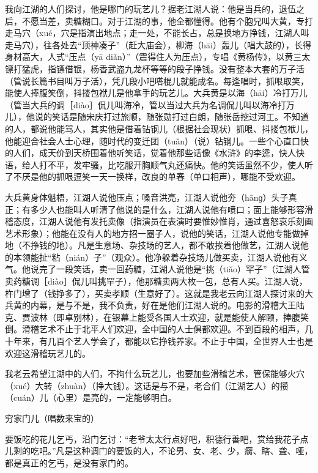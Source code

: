 \documentclass[12pt,UTF8]{ctexbook}
\begin{document}
我向江湖的人们探讨，他是哪门的玩艺儿？据老江湖人说：他是当兵的，退伍之后，不愿当差，卖糖糊口。对于江湖的事，他全都懂得。他有个胞兄叫大黄，专打走马穴（xué，穴是指演出地点；走一处，不能长占，总是换地方挣钱，江湖人叫走马穴），往各处去“顶神凑子”（赶大庙会），柳海（hāi）轰儿（唱大鼓的），长得身材高大，人式“压点（yā diǎn）”（震得住人为压点），专唱《黄杨传》，以黄三太镖打猛虎，指镖借银，杨香武盗九龙杯等等的段子挣钱。没有整本大套的万子活（管说长篇书目叫万子活），凭几段小吧嗒棍儿就能成名。每逢唱时，抓哏取笑，能使人捧腹笑倒，抖搂包袱儿是他拿手的玩艺儿。大兵黄是以海（hāi）冷打万儿（管当大兵的调［diào］侃儿叫海冷，管以当过大兵为名调侃儿叫以海冷打万儿），他说的笑话是随宋庆打过旅顺，随张勋打过白朗，随张岳挖过河工。不知道的人，都说他能骂人，其实他是借着钻钢儿（根据社会现状）抓哏、抖搂包袱儿，他能迎合社会人士心理，随时代的变迁团（tuǎn）（说）钻钢儿。一些个心直口快的人们，成天价到天桥围着他听笑话，觉着他那些话像《水浒》的李逵，快人快语，给人打不平，发牢骚，比吃服开胸顺气丸还痛快。他的笑话虽然不少，使人听了不厌是他的抓哏逗笑一天一换样，改良的单春（单口相声），哪能不受欢迎。

大兵黄身体魁梧，江湖人说他压点；嗓音洪亮，江湖人说他夯（hānɡ）头子真正；有多少人也能叫人听清了他说的是什么，江湖人说他有喷口；面上能够形容滑稽态度，江湖人说他有发托卖像（指演员在表演时要惟妙惟肖，通过喜怒哀乐刻画艺术形象）；他能在没有人的地方招一圈子人，说他的笑话，江湖人说他专能做掉地（不挣钱的地）。凡是生意场、杂技场的艺人，都不敢挨着他做艺，江湖人说他的本领能扯“粘（nián）子”（观众）。他净躲着杂技场儿做买卖，江湖人说他有义气。他说完了一段笑话，卖一回药糖，江湖人说他是“挑（tiǎo）罕子”（江湖人管卖药糖调［diào］侃儿叫挑罕子），他那糖卖两大枚一包，总有人买。江湖人说，杵门增了（钱挣多了），买卖孝顺（生意好了）。这就是我老云向江湖人探讨来的大兵黄的内幕，是与不是，我不负责，好在是他们江湖人说的。电影的滑稽大王陆克、贾波林（即卓别林），在银幕上能受各国人士欢迎，就是能使人解颐，捧腹笑倒。滑稽艺术不止于北平人们欢迎，全中国的人士俱都欢迎。不到百段的相声，几十年来，有几百个艺人学会了，都能以它挣钱养家。不止于中国，全世界人士也是欢迎这滑稽玩艺儿的。

我老云希望江湖中的人们，不拘什么玩艺儿，也要加些滑稽艺术，管保能够火穴（xué）大转（zhuàn）（挣大钱）。这话是与不是，老合们（江湖艺人）的攒（cuán）儿（心里）是亮的，一定能够明白。





穷家门儿（唱数来宝的）


要饭吃的花儿乞丐，沿门乞讨：“老爷太太行点好吧，积德行善吧，赏给我花子点儿剩的吃吧。”凡是这种调门的要饭的人，不论男、女、老、少，瘸、瞎、聋、哑，都是真正的乞丐，是没有家门的。
\end{document}
